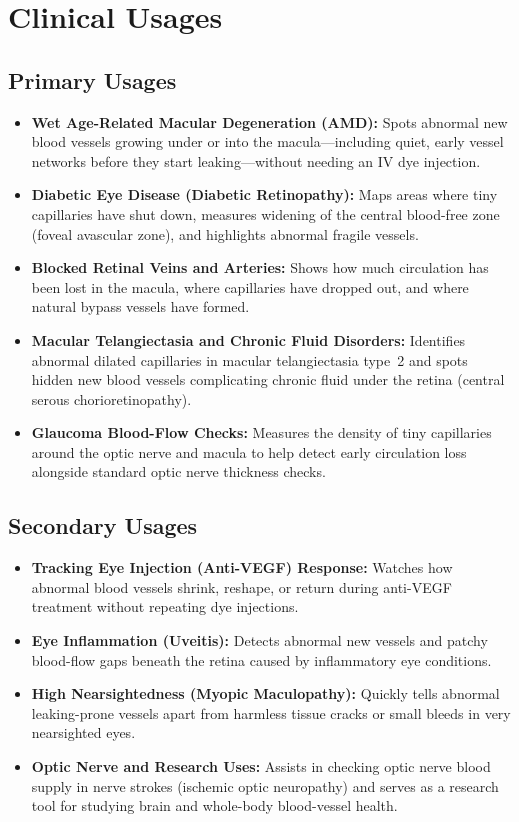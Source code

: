 \section{Clinical Usages}

\subsection{Primary Usages}
\begin{itemize}
\item \textbf{Wet Age-Related Macular Degeneration (AMD):} Spots abnormal new blood vessels growing under or into the macula---including quiet, early vessel networks before they start leaking---without needing an IV dye injection.
\item \textbf{Diabetic Eye Disease (Diabetic Retinopathy):} Maps areas where tiny capillaries have shut down, measures widening of the central blood-free zone (foveal avascular zone), and highlights abnormal fragile vessels.
\item \textbf{Blocked Retinal Veins and Arteries:} Shows how much circulation has been lost in the macula, where capillaries have dropped out, and where natural bypass vessels have formed.
\item \textbf{Macular Telangiectasia and Chronic Fluid Disorders:} Identifies abnormal dilated capillaries in macular telangiectasia type~2 and spots hidden new blood vessels complicating chronic fluid under the retina (central serous chorioretinopathy).
\item \textbf{Glaucoma Blood-Flow Checks:} Measures the density of tiny capillaries around the optic nerve and macula to help detect early circulation loss alongside standard optic nerve thickness checks.
\end{itemize}

\subsection{Secondary Usages}
\begin{itemize}
\item \textbf{Tracking Eye Injection (Anti-VEGF) Response:} Watches how abnormal blood vessels shrink, reshape, or return during anti-VEGF treatment without repeating dye injections.
\item \textbf{Eye Inflammation (Uveitis):} Detects abnormal new vessels and patchy blood-flow gaps beneath the retina caused by inflammatory eye conditions.
\item \textbf{High Nearsightedness (Myopic Maculopathy):} Quickly tells abnormal leaking-prone vessels apart from harmless tissue cracks or small bleeds in very nearsighted eyes.
\item \textbf{Optic Nerve and Research Uses:} Assists in checking optic nerve blood supply in nerve strokes (ischemic optic neuropathy) and serves as a research tool for studying brain and whole-body blood-vessel health.
\end{itemize}


